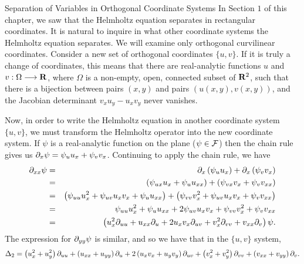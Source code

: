 \begin{section}{Separation of Variables in Orthogonal Coordinate Systems}
In Section $1$ of this chapter, we saw that the Helmholtz equation separates in rectangular coordinates.  It is natural to inquire in what other coordinate systems the Helmholtz equation separates.  We will examine only orthogonal curvilinear coordinates.  Consider a new set of orthogonal coordinates $\{ u,v \}$.  If it is truly a change of coordinates, this means that  there are real-analytic functions $u$ and $v: \Omega \longrightarrow \mathbf{R}$, where $\Omega$ is a non-empty, open, connected subset of $\mathbf{R}^2$, such that there is a bijection between pairs $(x,y)$ and pairs $(u(x,y), v(x,y))$, and  the Jacobian determinant $v_x u_y - u_x v_y$ never vanishes.

Now, in order to write the Helmholtz equation in another coordinate system $\{ u, v \}$, we must transform the Helmholtz operator into the new coordinate system.  If $\psi$ is a real-analytic function on the plane ($\psi \in \mathcal{F}$) then the chain rule gives us $\partial_{x} \psi = \psi_u u_x + \psi_v v_x$.  Continuing to apply the chain rule, we have
\begin{eqnarray*}
\partial_{x x} \psi	& = &	\partial_{x} \left( \psi_u u_x \right) + \partial_{x} \left( \psi_v v_x \right) \\
		& = &	\left( \psi_{ux} u_x + \psi_u u_{xx} \right) + \left( \psi_{vx} v_x + \psi_v v_{xx} \right) \\
		& = &	\left( \psi_{uu} u_x^2 + \psi_{uv} u_x v_x + \psi_u u_{xx} \right) + \left( \psi_{vv} v_x^2 + \psi_{uv} u_x v_x + \psi_v v_{xx} \right) \\
		& = &	\psi_{uu} u_x^2 + \psi_u u_{xx} + 2 \psi_{uv} u_x v_x + \psi_{vv} v_x^2 + \psi_v v_{xx} \\
		& = &	\left( u_x^2 \partial_{u u} + u_{xx} \partial_{u} + 2 u_x v_x \partial_{u v} + v_x^2 \partial_{v v} + v_{xx} \partial_{v} \right) \psi .
\end{eqnarray*}
The expression for $\partial_{y y} \psi$ is similar, and so we have that in the $\{ u,v \}$ system,
\begin{equation}
\label{laplaciantrans}
\Delta_2 = \left( u_x^2 + u_y^2 \right) \partial_{u u} + \left( u_{xx} + u_{yy} \right) \partial_{u} + 2\left( u_x v_x + u_y v_y \right) \partial_{u v} + \left( v_x^2 + v_y^2 \right) \partial_{v v} + \left( v_{xx} + v_{yy} \right) \partial_{v} .
\end{equation}


\end{section}
